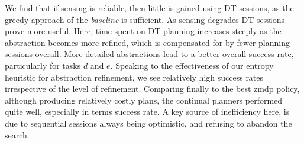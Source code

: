 We find that if sensing is reliable, then little is gained using DT
sessions, as the greedy approach of the {\em baseline} is
sufficient. As sensing degrades DT sessions prove more useful. Here,
time spent on DT planning increases steeply as the abstraction becomes
more refined, which is compensated for by fewer planning sessions
overall. More detailed abstractions lead to a better overall
success rate, particularly for tasks $d$ and $e$.
Speaking to the effectiveness of our entropy heuristic for abstraction
refinement, we see relatively high success rates irrespective of
the level of refinement. Comparing finally to the best {\sc
zmdp} policy, although producing relatively costly plans, the
continual planners performed quite well, especially in terms success
rate. A key source of inefficiency here, is due to sequential sessions
always being optimistic, and refusing to abandon the search.

